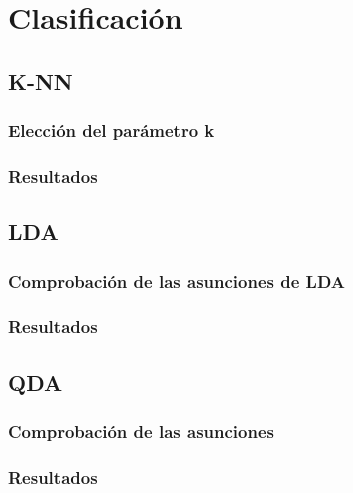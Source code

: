 \section{Clasificación}

\subsection{K-NN}

\subsubsection{Elección del parámetro k}

\subsubsection{Resultados}

\subsection{LDA}

\subsubsection{Comprobación de las asunciones de LDA}

\subsubsection{Resultados}

\subsection{QDA}

\subsubsection{Comprobación de las asunciones}

\subsubsection{Resultados}
